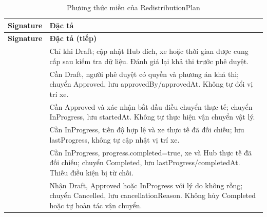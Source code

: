 \begin{longtable}{|L{58mm}|L{81mm}|}
\caption{Phương thức miền của RedistributionPlan}\\\hline
\textbf{Signature} & \textbf{Đặc tả}\\\hline
\endfirsthead
\hline\textbf{Signature} & \textbf{Đặc tả (tiếp)}\\\hline\endhead
{} &
Chỉ khi Draft; cập nhật Hub đích, xe hoặc thời gian được cung cấp sau kiểm tra dữ liệu. Đánh giá lại khả thi trước phê duyệt.\\\hline
{} &
Cần Draft, người phê duyệt có quyền và phương án khả thi; chuyển Approved, lưu approvedBy/approvedAt. Không tự đổi vị trí xe.\\\hline
{} &
Cần Approved và xác nhận bắt đầu điều chuyển thực tế; chuyển InProgress, lưu startedAt. Không tự thực hiện vận chuyển vật lý.\\\hline
{} &
Cần InProgress, tiến độ hợp lệ và xe thực tế đã đối chiếu; lưu lastProgress, không tự cập nhật vị trí xe.\\\hline
{} &
Cần InProgress, progress.completed=true, xe và Hub thực tế đã đối chiếu; chuyển Completed, lưu lastProgress/completedAt. Thiếu điều kiện bị từ chối.\\\hline
{} &
Nhận Draft, Approved hoặc InProgress với lý do không rỗng; chuyển Cancelled, lưu cancellationReason. Không hủy Completed hoặc tự hoàn tác vận chuyển.\\\hline
\end{longtable}

